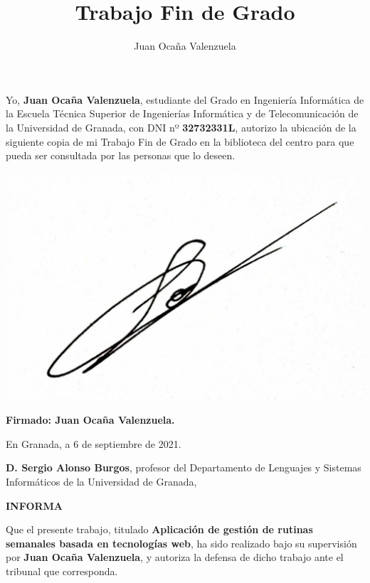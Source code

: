 \documentclass[10pt, a4paper]{aqademic}
\author{Juan Ocaña Valenzuela}
\title{Trabajo Fin de Grado}
\begin{document}
\AqMaketitle[%
	cover    = img/logo.png,
	org      = Grado en Ingeniería Informática,
	subtitle = Aplicación de gestión de rutinas semanales basada en tecnologías web,
	url		 = https://github.com/patchispatch/TFG,
	author   = Autor: Juan Ocaña Valenzuela\\Tutor: Sergio Alonso Burgos
]
\tableofcontents

\listoffigures

\newpage

Yo, \textbf{Juan Ocaña Valenzuela}, estudiante del Grado en Ingeniería Informática de la Escuela Técnica Superior de Ingenierías Informática y de Telecomunicación de la Universidad de Granada, con DNI nº \textbf{32732331L}, autorizo la ubicación de la siguiente copia de mi Trabajo Fin de Grado en la biblioteca del centro para que pueda ser consultada por las personas que lo deseen.


\vspace{6cm}

\includegraphics[scale=0.16]{img/firma.jpg}

\textbf{Firmado: Juan Ocaña Valenzuela.}

\bigskip

En Granada, a 6 de septiembre de 2021.

\newpage

\textbf{D. Sergio Alonso Burgos}, profesor del Departamento de Lenguajes y Sistemas Informáticos de la Universidad de Granada,

\textbf{\large{INFORMA}}

Que el presente trabajo, titulado \textbf{Aplicación de gestión de rutinas semanales basada en tecnologías web}, ha sido realizado bajo su supervisión por \textbf{Juan Ocaña Valenzuela}, y autoriza la defensa de dicho trabajo ante el tribunal que corresponda.
\end{document}
